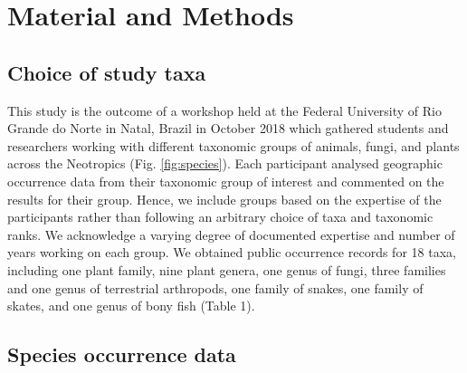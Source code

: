 \documentclass[fleqn,10pt,lineno]{wlpeerj} %
\begin{document}
\hypertarget{material-and-methods}{%
\section*{Material and Methods}\label{material-and-methods}}

\hypertarget{choice-of-study-taxa}{%
\subsection*{Choice of study taxa}\label{choice-of-study-taxa}}

This study is the outcome of a workshop held at the Federal University of Rio Grande do Norte in Natal, Brazil in October 2018 which gathered students and researchers working with different taxonomic groups of animals, fungi, and plants across the Neotropics (Fig. \ref{fig:species}). Each participant analysed geographic occurrence data from their taxonomic group of interest and commented on the results for their group. Hence, we include groups based on the expertise of the participants rather than following an arbitrary choice of taxa and taxonomic ranks. We acknowledge a varying degree of documented expertise and number of years working on each group. We obtained public occurrence records for 18 taxa, including one plant family, nine plant genera, one genus of fungi, three families and one genus of terrestrial arthropods, one family of snakes, one family of skates, and one genus of bony fish (Table 1).

\hypertarget{species-occurrence-data}{%
\subsection*{Species occurrence data}\label{species-occurrence-data}}
\end{document}
